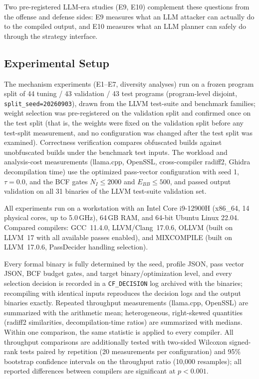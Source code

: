 \documentclass[pdflatex,sn-mathphys-num]{sn-jnl}
\theoremstyle{thmstyleone}%
\theoremstyle{thmstyletwo}%
\theoremstyle{thmstylethree}%
\begin{document}
Two pre-registered LLM-era studies (E9, E10) complement these questions from
the offense and defense sides: E9 measures what an LLM attacker can actually
do to the compiled output, and E10 measures what an LLM planner can safely do
through the strategy interface.

\subsection{Experimental Setup}
\label{sec:setup}

The mechanism experiments (E1--E7, diversity analyses) run on a frozen program split
of 44 tuning / 43 validation / 43 test programs (program-level disjoint,
\texttt{split\_seed=20260903}), drawn from the LLVM test-suite and benchmark
families; weight selection was pre-registered on the validation split and
confirmed once on the test split (that is, the weights were fixed on the
validation split before any test-split measurement, and no configuration was
changed after the test split was examined). Correctness verification compares obfuscated
builds against unobfuscated builds under the benchmark test inputs. The workload
and analysis-cost measurements (llama.cpp, OpenSSL, cross-compiler radiff2, Ghidra
decompilation time) use the optimized pass-vector configuration with seed 1,
$\tau=0.0$, and the BCF gates $N_I\leq2000$ and $E_{BB}\leq500$, and passed output
validation on all 31 binaries of the LLVM test-suite validation set.

All experiments run on a workstation with an Intel Core i9-12900H (x86\_64, 14
physical cores, up to 5.0\,GHz), 64\,GB RAM, and 64-bit Ubuntu Linux 22.04. Compared
compilers: GCC~11.4.0, LLVM/Clang~17.0.6, OLLVM (built on LLVM~17 with all available
passes enabled), and MIXCOMPILE (built on LLVM~17.0.6, PassDecider handling
selection).

Every formal binary is fully determined by the seed, profile JSON, pass vector
JSON, BCF budget gates, and target binary/optimization level, and every
selection decision is recorded in a \texttt{CF\_DECISION} log archived with
the binaries; recompiling with identical inputs reproduces the decision logs
and the output binaries exactly. Repeated throughput measurements (llama.cpp,
OpenSSL) are summarized with the arithmetic mean; heterogeneous, right-skewed
quantities (radiff2 similarities, decompilation-time ratios) are summarized
with medians. Within one comparison, the same statistic is applied to every
compiler. All throughput comparisons are additionally tested with two-sided
Wilcoxon signed-rank tests paired by repetition (20 measurements per
configuration) and 95\% bootstrap confidence intervals on the throughput
ratio (10{,}000 resamples); all reported differences between compilers are
significant at $p<0.001$.
\end{document}
